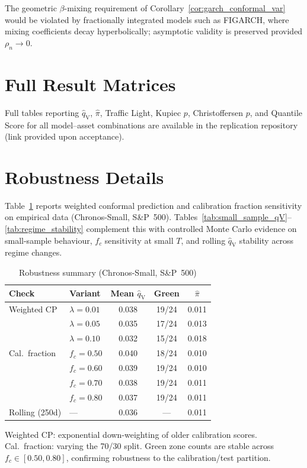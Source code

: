 \documentclass[preprint,11pt,authoryear]{elsarticle}
\newcommand{\1}{\boldsymbol{1}}
\newcommand{\qV}{\hat{q}_{\scriptscriptstyle\mathrm{V}}}
\begin{document}
	The geometric $\beta$-mixing requirement of Corollary~\ref{cor:garch_conformal_var} would be violated by fractionally integrated models such as FIGARCH, where mixing coefficients decay hyperbolically; asymptotic validity is preserved provided $\rho_n \to 0$.
	
	
	\section{Full Result Matrices}
	\label{app:full_results}
	
	Full tables reporting $\qV$, $\hat\pi$, Traffic Light, Kupiec $p$, Christoffersen $p$, and Quantile Score for all model--asset combinations are available in the replication repository (link provided upon acceptance).
	
	
	\section{Robustness Details}
	\label{app:robustness}
	
	Table~\ref{tab:robustness} reports weighted conformal prediction
	and calibration fraction sensitivity on empirical data
	(Chronos-Small, S\&P~500). Tables~\ref{tab:small_sample_qV}--\ref{tab:regime_stability}
	complement this with controlled Monte Carlo evidence on
	small-sample behaviour, $f_c$ sensitivity at small $T$, and
	rolling $\qV$ stability across regime changes.
	
	\begin{table}[H]
		\centering
		\caption{Robustness summary (Chronos-Small, S\&P~500)}
		\label{tab:robustness}
		\footnotesize
		\begin{tabular}{@{}llccc@{}}
			\toprule
			Check & Variant & Mean $\qV$ & Green & $\hat\pi$ \\
			\midrule
			Weighted CP     & $\lambda=0.01$  & 0.038 & 19/24 & 0.011 \\
			& $\lambda=0.05$  & 0.035 & 17/24 & 0.013 \\
			& $\lambda=0.10$  & 0.032 & 15/24 & 0.018 \\
			\midrule
			Cal.\ fraction  & $f_c=0.50$      & 0.040 & 18/24 & 0.010 \\
			& $f_c=0.60$      & 0.039 & 19/24 & 0.010 \\
			& $f_c=0.70$      & 0.038 & 19/24 & 0.011 \\
			& $f_c=0.80$      & 0.037 & 19/24 & 0.011 \\
			\midrule
			Rolling (250d)  & ---             & 0.036 & --- & 0.011 \\
			\bottomrule
		\end{tabular}
		\begin{minipage}{\linewidth}\footnotesize
			\smallskip
			Weighted CP: exponential down-weighting of older calibration scores. Cal.\ fraction: varying the 70/30 split. Green zone counts are stable across $f_c \in [0.50, 0.80]$, confirming robustness to the calibration/test partition.
		\end{minipage}
	\end{table}
	
\end{document}
